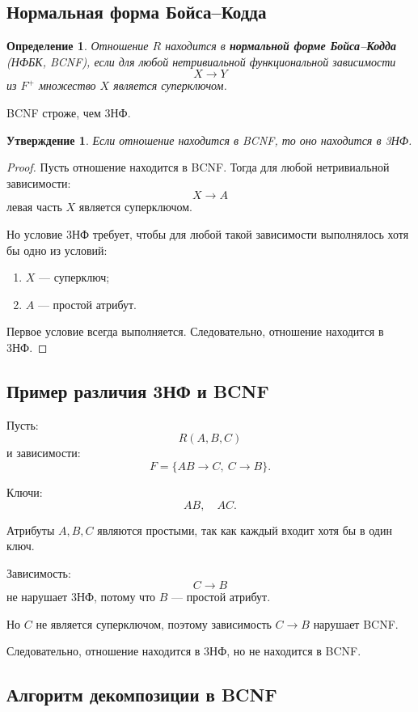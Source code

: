 \documentclass[12pt,a4paper]{article}
\newtheorem{definition}{Определение}[section]
\newtheorem{proposition}{Утверждение}[section]
\theoremstyle{remark}
\begin{document}
\subsection{Нормальная форма Бойса--Кодда}

\begin{definition}
Отношение $R$ находится в \textbf{нормальной форме Бойса--Кодда} (НФБК, BCNF), если для любой нетривиальной функциональной зависимости
\[
X \to Y
\]
из $F^+$ множество $X$ является суперключом.
\end{definition}

BCNF строже, чем 3НФ.

\begin{proposition}
Если отношение находится в BCNF, то оно находится в 3НФ.
\end{proposition}

\begin{proof}
Пусть отношение находится в BCNF. Тогда для любой нетривиальной зависимости:
\[
X \to A
\]
левая часть $X$ является суперключом.

Но условие 3НФ требует, чтобы для любой такой зависимости выполнялось хотя бы одно из условий:
\begin{enumerate}
    \item $X$ --- суперключ;
    \item $A$ --- простой атрибут.
\end{enumerate}

Первое условие всегда выполняется. Следовательно, отношение находится в 3НФ.
\end{proof}

\subsection{Пример различия 3НФ и BCNF}

Пусть:
\[
R(A,B,C)
\]
и зависимости:
\[
F = \{AB \to C,\ C \to B\}.
\]

Ключи:
\[
AB,\quad AC.
\]

Атрибуты $A,B,C$ являются простыми, так как каждый входит хотя бы в один ключ.

Зависимость:
\[
C \to B
\]
не нарушает 3НФ, потому что $B$ --- простой атрибут.

Но $C$ не является суперключом, поэтому зависимость $C \to B$ нарушает BCNF.

Следовательно, отношение находится в 3НФ, но не находится в BCNF.

\subsection{Алгоритм декомпозиции в BCNF}
\end{document}
